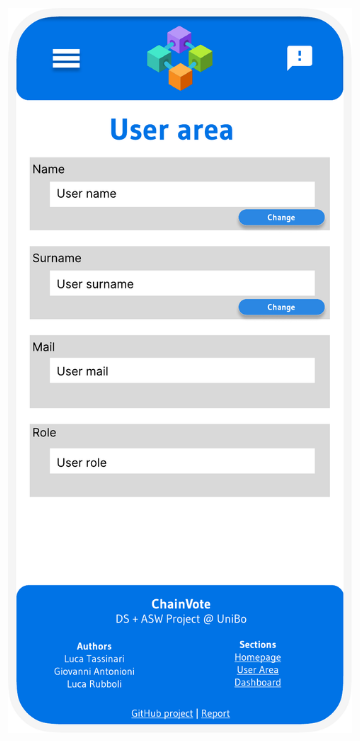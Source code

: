 \documentclass{scrartcl}
\begin{document}
\begin{figure}[h]
    \begin{subfigure}[b]{0.3\textwidth}
        \centering
        \includegraphics[width=\textwidth]{./figures/mockups/user-area.pdf}

\end{subfigure}
\end{figure}
\end{document}
